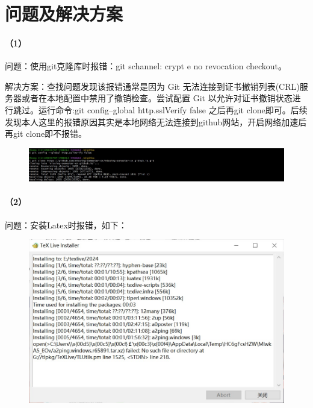 \documentclass[a4paper, 12pt]{article}
\begin{document}
	\section{问题及解决方案}
	
	\paragraph{（1）}
	问题：使用git克隆库时报错：git schannel: crypt e no revocation checkout。
	
	解决方案：查找问题发现该报错通常是因为 Git 无法连接到证书撤销列表(CRL)服务器或者在本地配置中禁用了撤销检查。尝试配置 Git 以允许对证书撤销状态进行跳过。运行命令:git config--global http.sslVerify false 之后再git clone即可。后续发现本人这里的报错原因其实是本地网络无法连接到github网站，开启网络加速后再git clone即不报错。
	
	\begin{figure}[h]
		\centering
		\includegraphics[width=1\textwidth]{99.jpg}
	\end{figure}
	
	\paragraph{（2）}
	问题：安装Latex时报错，如下：
	
	\begin{figure}[H]
		\centering
		\includegraphics[width=1\textwidth]{102.jpg}
	\end{figure}
	
\end{document}

